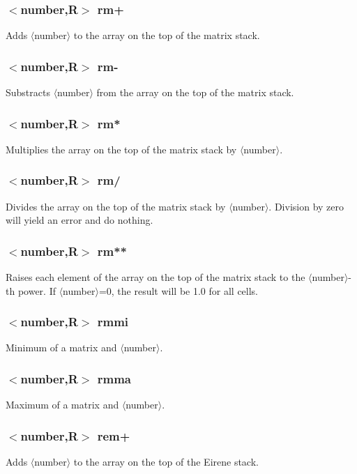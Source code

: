 \documentclass[a4paper,10pt]{report}
\begin{document}
\subsubsection{$<$number,{\bf R}$>$ rm+}\label{sec:rm+}
Adds $\langle$number$\rangle$ to the array on the top of the matrix stack.

\subsubsection{$<$number,{\bf R}$>$ rm-}\label{sec:rm-}
Substracts $\langle$number$\rangle$ from the array on the top of the matrix stack.

\subsubsection{$<$number,{\bf R}$>$ rm*}\label{sec:rm*}
Multiplies the array on the top of the matrix stack by $\langle$number$\rangle$.

\subsubsection{$<$number,{\bf R}$>$ rm/}\label{sec:rm/}
Divides the array on the top of the matrix stack by $\langle$number$\rangle$. Division by
zero will yield an error and do nothing.

\subsubsection{$<$number,{\bf R}$>$ rm**}\label{sec:rm**}
Raises each element of the array on the top of the matrix stack to the $\langle$number$\rangle$-th power. If $\langle$number$\rangle$=0, the result will be 1.0 for all cells.

\subsubsection{$<$number,{\bf R}$>$ rmmi}\label{sec:rmmi}
Minimum of a matrix and $\langle$number$\rangle$.

\subsubsection{$<$number,{\bf R}$>$ rmma}\label{sec:rmma}
Maximum of a matrix and $\langle$number$\rangle$.

\subsubsection{$<$number,{\bf R}$>$ rem+}\label{sec:rem+}
Adds $\langle$number$\rangle$ to the array on the top of the Eirene stack.
\end{document}
